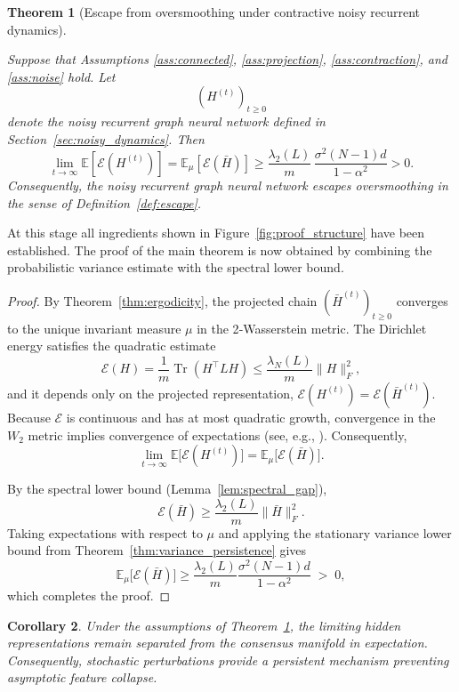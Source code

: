\documentclass{article}
\newtheorem{theorem}{Theorem}[section]
\newtheorem{corollary}[theorem]{Corollary}
\begin{document}
\begin{theorem}[Escape from oversmoothing under contractive noisy recurrent dynamics]
	\label{thm:main}
	
Suppose that Assumptions
\ref{ass:connected},
\ref{ass:projection},
\ref{ass:contraction},
and
\ref{ass:noise}
hold.	
	Let	
	\[
	(H^{(t)})_{t\ge0}
	\]
	denote the noisy recurrent graph neural network defined in
	Section~\ref{sec:noisy_dynamics}.
	Then	
\[
\boxed{
	\lim_{t\rightarrow\infty}
	\mathbb E
	\!\left[
	\mathcal E(H^{(t)})
	\right]
	=
	\mathbb E_\mu
	\!\left[
	\mathcal E(\bar H)
	\right]
	\ge
	\frac{\lambda_2(L)}{m}
	\,
	\frac{\sigma^2(N-1)d}
	{1-\alpha^2}
	>0.
}
\]
	Consequently, the noisy recurrent graph neural network escapes
	oversmoothing in the sense of
	Definition~\ref{def:escape}.	
\end{theorem}

At this stage all ingredients shown in
Figure~\ref{fig:proof_structure}
have been established.
The proof of the main theorem is now obtained by combining the
probabilistic variance estimate with the spectral lower bound.

\begin{proof}
	By Theorem~\ref{thm:ergodicity}, the projected chain
	$(\bar H^{(t)})_{t\ge0}$ converges to the unique invariant measure $\mu$
	in the 2‑Wasserstein metric.  The Dirichlet energy satisfies the
	quadratic estimate
	\[
	\mathcal E(H) = \frac1m\operatorname{Tr}(H^{\top}LH)
	\le \frac{\lambda_N(L)}{m}\|H\|_F^2,
	\]
	and it depends only on the projected representation,
	$\mathcal E(H^{(t)}) = \mathcal E(\bar H^{(t)})$.  Because $\mathcal E$ is
	continuous and has at most quadratic growth, convergence in the
	$W_2$ metric implies convergence of expectations (see, e.g.,
	\cite[Chapter~6]{villani2009}).
	Consequently,
	\[
	\lim_{t\to\infty} \mathbb E\bigl[\mathcal E(H^{(t)})\bigr]
	= \mathbb E_\mu\bigl[\mathcal E(\bar H)\bigr].
	\]
	
	By the spectral lower bound (Lemma~\ref{lem:spectral_gap}),
	\[\mathcal E(\bar H) \ge \frac{\lambda_2(L)}{m}\|\bar H\|_F^2.\]
	Taking expectations with respect to $\mu$ and applying the stationary
	variance lower bound from Theorem~\ref{thm:variance_persistence} gives
	\[
	\mathbb E_\mu\bigl[\mathcal E(\bar H)\bigr]
	\ge \frac{\lambda_2(L)}{m}
	\frac{\sigma^2(N-1)d}{1-\alpha^2} \;>\; 0,
	\]
	which completes the proof.
\end{proof}


\begin{corollary}
	
	Under the assumptions of
	Theorem~\ref{thm:main},
	the limiting hidden representations remain separated from the consensus
	manifold in expectation.
	Consequently, stochastic perturbations provide a persistent mechanism
	preventing asymptotic feature collapse.
	
\end{corollary}
\end{document}

